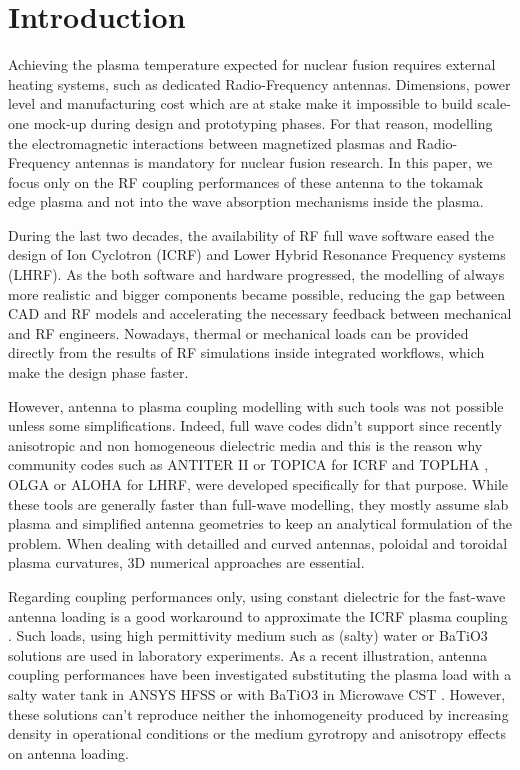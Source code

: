 \documentclass[preprint,3p,twocolumn]{elsarticle}
\begin{document}
\linenumbers

\section{Introduction}
Achieving the plasma temperature expected for nuclear fusion requires external heating systems, such as dedicated Radio-Frequency antennas. Dimensions, power level and manufacturing cost which are at stake make it impossible to build scale-one mock-up during design and prototyping phases. For that reason, modelling the electromagnetic interactions between magnetized plasmas and Radio-Frequency antennas is mandatory for nuclear fusion research. In this paper, we focus only on the RF coupling performances of these antenna to the tokamak edge plasma and not into the wave absorption mechanisms inside the plasma. 

During the last two decades, the availability of RF full wave software eased the design of Ion Cyclotron ({ICRF}) and Lower Hybrid Resonance Frequency systems ({LHRF}). As the both software and hardware progressed, the modelling of always more realistic and bigger components became possible, reducing the gap between CAD and RF models and accelerating the necessary feedback between mechanical and RF engineers. Nowadays, thermal or mechanical loads can be provided directly from the results of RF simulations inside integrated workflows, which make the design phase faster.

However, antenna to plasma coupling modelling with such tools was not possible unless some simplifications. Indeed, full wave codes didn't support since recently anisotropic and non homogeneous dielectric media and this is the reason why community codes such as {ANTITER II} \cite{Messiaen2011} or {TOPICA} \cite{Lancellotti2006} for {ICRF} and {TOPLHA} \cite{Milanesio2012}, {OLGA} \cite{Preinhaelter2017} or {ALOHA} \cite{Hillairet2010a} for LHRF, were developed specifically for that purpose. While these tools are generally faster than full-wave modelling, they mostly assume slab plasma and simplified antenna geometries to keep an analytical formulation of the problem. When dealing with detailled and curved antennas, poloidal and toroidal plasma curvatures, 3D numerical approaches are essential.  

Regarding coupling performances only, using constant dielectric for the fast-wave antenna loading is a good workaround to approximate the ICRF plasma coupling \cite{Messiaen2011a}. Such loads, using high permittivity medium such as (salty) water\cite{Messiaen2005} or BaTiO3 solutions\cite{Helou2018} are used in laboratory experiments. As a recent illustration, antenna coupling performances have been investigated substituting the plasma load  with a salty water tank in ANSYS HFSS \cite{Ravera2012, Qin2015} or with BaTiO3 in Microwave CST \cite{Bottollier-Curtet2011}. However, these solutions can't reproduce neither the inhomogeneity produced by increasing density in operational conditions or the medium gyrotropy and anisotropy effects on antenna loading. 
\end{document}

